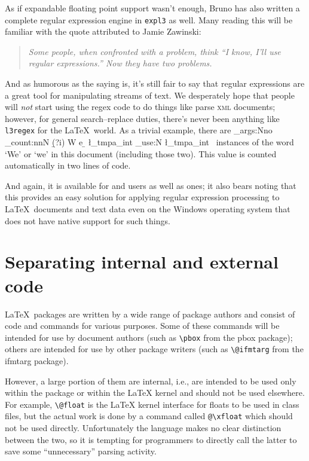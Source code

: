 \documentclass{ltnews}
\begin{document}
As if expandable floating point support wasn't enough, Bruno has also written a complete regular expression engine in \texttt{expl3} as well.
Many reading this will be familiar with the quote attributed to Jamie Zawinski:
\begin{quote}\itshape
Some people, when confronted with a problem, think
``I know, I'll use regular expressions.''
Now they have two problems.
\end{quote}
And as humorous as the saying is, it's still fair to say that regular expressions are a great tool for manipulating streams of text.
We desperately hope that people will \emph{not} start using the regex code to do things like parse \textsc{xml} documents; however, for general search--replace duties, there's never been anything like \texttt{l3regex} for the \LaTeX\ world.
As a trivial example, there are
\CatchFileDef{}%
\ExplSyntaxOn
\exp_args:Nno \regex_count:nnN { \b (?i) W e \b  } {\thisfile} \l_tmpa_int
\int_use:N \l_tmpa_int
\ExplSyntaxOff
~instances of the word `We' or `we' in this document (including those two).
This value is counted automatically in two lines of code.

And again, it is available for  and  users as well as  ones; it also bears noting that this provides an easy solution for applying regular expression processing to \LaTeX\ documents and text data even on the Windows operating system that does not have native support for such things.


\section{Separating internal and external code}

\LaTeX\ packages are written by a wide range of package authors and consist of code and commands for various purposes.
Some of these commands will be intended for use by document authors (such as \verb|\pbox| from the \textsf{pbox} package); others are intended for use by other package writers (such as \verb|\@ifmtarg| from the \textsf{ifmtarg} package).

However, a large portion of them are internal, i.e., are intended to
be used only within the package or within the \LaTeX{} kernel and
should not be used elsewhere. For example, \verb|\@float| is the
\LaTeX{} kernel interface for floats to be used in class files, but
the actual work is done by a command called \verb|@\xfloat| which
should not be used directly. Unfortunately the \LaTeXe{} language
makes no clear distinction between the two, so it is tempting for
programmers to directly call the latter to save some ``unnecessary''
parsing activity.
\end{document}
